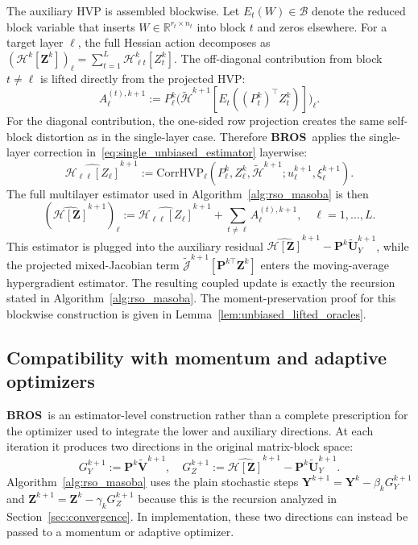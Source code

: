 \documentclass{pkumelon}
\theoremstyle{plain}
\newcommand{\oursname}{\textnormal{\textbf{BROS}}}
\newcommand{\ours}{\oursname\ }
\begin{document}
The auxiliary HVP is assembled blockwise. Let $E_t(W)\in\mathcal B$ denote the reduced block variable that inserts $W\in\mathbb R^{r_t\times n_t}$ into block $t$ and zeros elsewhere. For a target layer $\ell$, the full Hessian action decomposes as $(\mathcal H^k[\boldsymbol Z^k])_\ell=\sum_{t=1}^L\mathcal H_{\ell t}^k[Z_t^k]$. The off-diagonal contribution from block $t\ne\ell$ is lifted directly from the projected HVP:
\begin{equation*}
A_\ell^{(t),k+1}:=P_\ell^k\bigl(\tilde{\mathcal H}^{k+1}[E_t((P_t^k)^\top Z_t^k)]\bigr)_\ell.
\end{equation*}
For the diagonal contribution, the one-sided row projection creates the same self-block distortion as in the single-layer case. Therefore \ours applies the single-layer correction in~\eqref{eq:single_unbiased_estimator} layerwise:
\begin{equation*}
\widehat{\mathcal H_{\ell\ell}[Z_\ell]}^{k+1}:=\mathrm{CorrHVP}_\ell\!\left(P_\ell^k,Z_\ell^k,\tilde{\mathcal H}^{k+1};u_\ell^{k+1},\xi_\ell^{k+1}\right).
\end{equation*}
The full multilayer estimator used in Algorithm~\ref{alg:rso_masoba} is then
\begin{equation*}
(\widehat{\mathcal H[\boldsymbol Z]}^{k+1})_\ell:=\widehat{\mathcal H_{\ell\ell}[Z_\ell]}^{k+1}+\sum_{t\ne\ell}A_\ell^{(t),k+1}, \quad \ell=1,\ldots,L.
\end{equation*}
This estimator is plugged into the auxiliary residual $\widehat{\mathcal H[\boldsymbol Z]}^{k+1}-\boldsymbol P^k\tilde{\boldsymbol U}_Y^{k+1}$, while the projected mixed-Jacobian term $\tilde{\mathcal J}^{k+1}[\boldsymbol P^{k\top}\boldsymbol Z^k]$ enters the moving-average hypergradient estimator. The resulting coupled update is exactly the recursion stated in Algorithm~\ref{alg:rso_masoba}. The moment-preservation proof for this blockwise construction is given in Lemma~\ref{lem:unbiased_lifted_oracles}.

\subsection{Compatibility with momentum and adaptive optimizers}
\label{app:optimizer_compatibility}

\ours is an estimator-level construction rather than a complete prescription for the optimizer used to integrate the lower and auxiliary directions. At each iteration it produces two directions in the original matrix-block space:
\begin{equation*}
G_Y^{k+1}:=\boldsymbol P^k\tilde{\boldsymbol V}^{k+1}, \quad G_Z^{k+1}:=\widehat{\mathcal H[\boldsymbol Z]}^{k+1}-\boldsymbol P^k\tilde{\boldsymbol U}_Y^{k+1}.
\end{equation*}
Algorithm~\ref{alg:rso_masoba} uses the plain stochastic steps $\boldsymbol Y^{k+1}=\boldsymbol Y^k-\beta_kG_Y^{k+1}$ and $\boldsymbol Z^{k+1}=\boldsymbol Z^k-\gamma_kG_Z^{k+1}$ because this is the recursion analyzed in Section~\ref{sec:convergence}. In implementation, these two directions can instead be passed to a momentum or adaptive optimizer.
\end{document}
